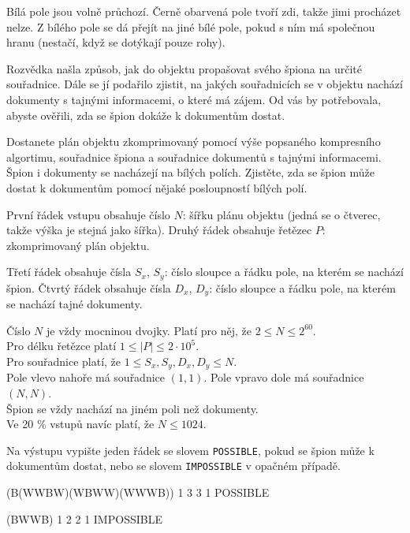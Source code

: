 Bílá pole jsou volně průchozí. Černě obarvená pole tvoří zdi, takže jimi
procházet nelze. Z bílého pole se dá přejít na jiné bílé pole, pokud s ním má
společnou hranu (nestačí, když se dotýkají pouze rohy).

Rozvědka našla způsob, jak do objektu propašovat svého špiona na určité
souřadnice. Dále se jí podařilo zjistit, na jakých souřadnicích se v objektu
nachází dokumenty s tajnými informacemi, o které má zájem. Od vás by
potřebovala, abyste ověřili, zda se špion dokáže k dokumentům dostat.


Dostanete plán objektu zkomprimovaný pomocí výše popsaného kompresního
algortimu, souřadnice špiona a souřadnice dokumentů s tajnými informacemi. Špion
i dokumenty se nacházejí na bílých polích. Zjistěte, zda se špion může dostat
k dokumentům pomocí nějaké posloupností bílých polí.


První řádek vstupu obsahuje číslo $N$: šířku plánu objektu (jedná se o čtverec,
takže výška je stejná jako šířka). Druhý řádek obsahuje řetězec $P$:
zkomprimovaný plán objektu.

Třetí řádek obsahuje čísla $S_x$, $S_y$: číslo sloupce a řádku pole, na kterém
se nachází špion. Čtvrtý řádek obsahuje čísla $D_x$, $D_y$: číslo sloupce a
řádku pole, na kterém se nachází tajné dokumenty.

\bigskip
\noindent
Číslo $N$ je vždy mocninou dvojky. Platí pro něj, že $2 \leq N \leq 2^{60}$.\\
Pro délku řetězce platí $1 \leq \vert P \vert \leq 2 \cdot 10^5$.\\
Pro souřadnice platí, že $1 \leq S_x, S_y, D_x, D_y \leq N$.\\
Pole vlevo nahoře má souřadnice $(1, 1)$. Pole vpravo dole má souřadnice $(N, N)$.\\
Špion se vždy nachází na jiném poli než dokumenty.\\
Ve 20 \% vstupů navíc platí, že $N \leq 1024$.


Na výstupu vypište jeden řádek se slovem \texttt{POSSIBLE}, pokud se špion může
k dokumentům dostat, nebo se slovem \texttt{IMPOSSIBLE} v opačném případě.


(B(WWBW)(WBWW)(WWWB))
1 3
3 1
\sampleOUT
POSSIBLE
\sampleEND

(BWWB)
1 2
2 1
\sampleOUT
IMPOSSIBLE
\sampleEND


